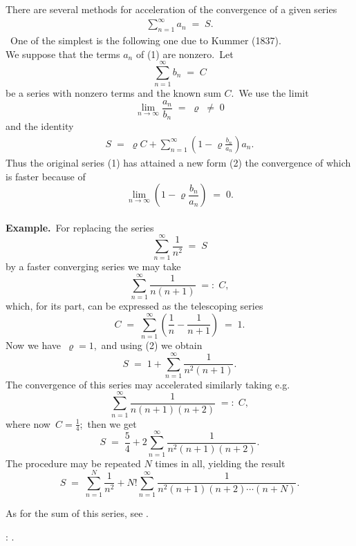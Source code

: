 \documentclass[12pt]{article}
\theoremstyle{definition}
\begin{document}

There are several methods for acceleration of the convergence of a given series 
\begin{align}
\sum_{n=1}^\infty a_n \;=\; S.
\end{align}\
One of the simplest is the following one due to Kummer (1837).\\

We suppose that the terms $a_n$ of (1) are nonzero.\, Let
$$\sum_{n=1}^\infty b_n \;=\; C$$
be a series with nonzero terms and the known sum $C$.\, We use the limit
$$\lim_{n\to\infty}\frac{a_n}{b_n} \;=\; \varrho \;\neq\; 0$$
and the identity
\begin{align}
S \;=\; \varrho C+ \sum_{n=1}^\infty\left(1-\varrho\frac{b_n}{a_n}\right)a_n.
\end{align}
Thus the original series (1) has attained a new form (2) the convergence of which is faster because of 
$$\lim_{n\to\infty}\left(1-\varrho\frac{b_n}{a_n}\right) \;=\;0.$$\\

\textbf{Example.}\, For replacing the series 
$$\sum_{n=1}^\infty\frac{1}{n^2} \;=\; S$$
by a faster converging series we may take 
$$\sum_{n=1}^\infty\frac{1}{n(n\!+\!1)} \;=:\; C,$$
which, for its part, can be expressed as the telescoping series
$$C \;=\; \sum_{n=1}^\infty\left(\frac{1}{n}-\frac{1}{n\!+\!1}\right) \;=\; 1.$$
Now we have\, $\varrho = 1$,\, and using (2) we obtain
$$S \;=\; 1+\sum_{n=1}^\infty\frac{1}{n^2(n\!+\!1)}.$$
The convergence of this series may accelerated similarly taking e.g.
$$\sum_{n=1}^\infty\frac{1}{n(n\!+\!1)(n\!+\!2)} \;=:\; C,$$
where now\, $C = \frac{1}{4}$;\, then we get
$$S \;=\; \frac{5}{4}+2\!\sum_{n=1}^\infty\frac{1}{n^2(n\!+\!1)(n\!+\!2)}.$$
The procedure may be repeated $N$ times in all, yielding the result
$$S \;=\; \sum_{n=1}^N\frac{1}{n^2}+N!\sum_{n=1}^\infty\frac{1}{n^2(n\!+\!1)(n\!+\!2)\cdots(n\!+\!N)}.$$

As for the sum of this series, see 
.




\begin{thebibliography}{8}
: .
\end{thebibliography}

\end{document}
